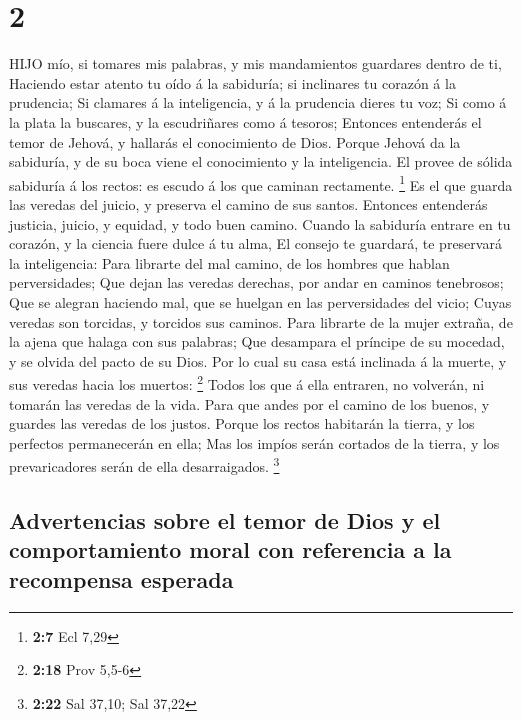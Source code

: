 \hypertarget{section-1}{%
\section{2}\label{section-1}}

 HIJO mío, si tomares mis palabras, y mis mandamientos
guardares dentro de ti,  Haciendo estar atento tu oído á la
sabiduría; si inclinares tu corazón á la prudencia;  Si
clamares á la inteligencia, y á la prudencia dieres tu voz; 
Si como á la plata la buscares, y la escudriñares como á tesoros;
 Entonces entenderás el temor de Jehová, y hallarás el
conocimiento de Dios.  Porque Jehová da la sabiduría, y de
su boca viene el conocimiento y la inteligencia.  El provee
de sólida sabiduría á los rectos: es escudo á los que caminan
rectamente. \footnote{\textbf{2:7} Ecl 7,29}  Es el que
guarda las veredas del juicio, y preserva el camino de sus santos.
 Entonces entenderás justicia, juicio, y equidad, y todo
buen camino.  Cuando la sabiduría entrare en tu corazón, y
la ciencia fuere dulce á tu alma,  El consejo te guardará,
te preservará la inteligencia:  Para librarte del mal
camino, de los hombres que hablan perversidades;  Que dejan
las veredas derechas, por andar en caminos tenebrosos;  Que
se alegran haciendo mal, que se huelgan en las perversidades del vicio;
 Cuyas veredas son torcidas, y torcidos sus caminos.
 Para librarte de la mujer extraña, de la ajena que halaga
con sus palabras;  Que desampara el príncipe de su mocedad,
y se olvida del pacto de su Dios.  Por lo cual su casa está
inclinada á la muerte, y sus veredas hacia los muertos: \footnote{\textbf{2:18}
  Prov 5,5-6}  Todos los que á ella entraren, no volverán,
ni tomarán las veredas de la vida.  Para que andes por el
camino de los buenos, y guardes las veredas de los justos. 
Porque los rectos habitarán la tierra, y los perfectos permanecerán en
ella;  Mas los impíos serán cortados de la tierra, y los
prevaricadores serán de ella desarraigados. \footnote{\textbf{2:22} Sal
  37,10; Sal 37,22}

\hypertarget{advertencias-sobre-el-temor-de-dios-y-el-comportamiento-moral-con-referencia-a-la-recompensa-esperada}{%
\subsection{Advertencias sobre el temor de Dios y el comportamiento
moral con referencia a la recompensa
esperada}\label{advertencias-sobre-el-temor-de-dios-y-el-comportamiento-moral-con-referencia-a-la-recompensa-esperada}}

